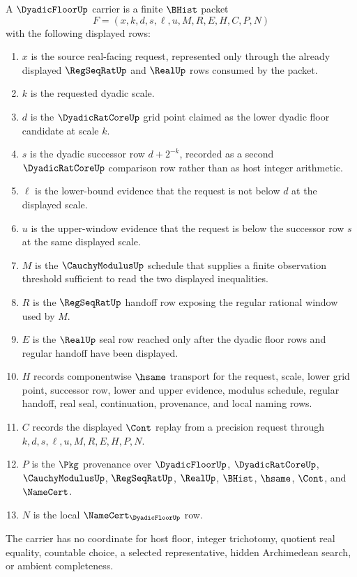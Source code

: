 \begin{definition}
\label{def:dyadic-floor-carrier}
A $\DyadicFloorUp$ carrier is a finite $\BHist$ packet
$$
F=(x,k,d,s,\ell,u,M,R,E,H,C,P,N)
$$
with the following displayed rows:
\begin{enumerate}
\item $x$ is the source real-facing request, represented only through the already displayed $\RegSeqRatUp$ and $\RealUp$ rows consumed by the packet.
\item $k$ is the requested dyadic scale.
\item $d$ is the $\DyadicRatCoreUp$ grid point claimed as the lower dyadic floor candidate at scale $k$.
\item $s$ is the dyadic successor row $d+2^{-k}$, recorded as a second $\DyadicRatCoreUp$ comparison row rather than as host integer arithmetic.
\item $\ell$ is the lower-bound evidence that the request is not below $d$ at the displayed scale.
\item $u$ is the upper-window evidence that the request is below the successor row $s$ at the same displayed scale.
\item $M$ is the $\CauchyModulusUp$ schedule that supplies a finite observation threshold sufficient to read the two displayed inequalities.
\item $R$ is the $\RegSeqRatUp$ handoff row exposing the regular rational window used by $M$.
\item $E$ is the $\RealUp$ seal row reached only after the dyadic floor rows and regular handoff have been displayed.
\item $H$ records componentwise $\hsame$ transport for the request, scale, lower grid point, successor row, lower and upper evidence, modulus schedule, regular handoff, real seal, continuation, provenance, and local naming rows.
\item $C$ records the displayed $\Cont$ replay from a precision request through $k,d,s,\ell,u,M,R,E,H,P,N$.
\item $P$ is the $\Pkg$ provenance over $\DyadicFloorUp$, $\DyadicRatCoreUp$, $\CauchyModulusUp$, $\RegSeqRatUp$, $\RealUp$, $\BHist$, $\hsame$, $\Cont$, and $\NameCert$.
\item $N$ is the local $\NameCert_{\DyadicFloorUp}$ row.
\end{enumerate}
The carrier has no coordinate for host floor, integer trichotomy, quotient real equality, countable choice, a selected representative, hidden Archimedean search, or ambient completeness.
\end{definition}

